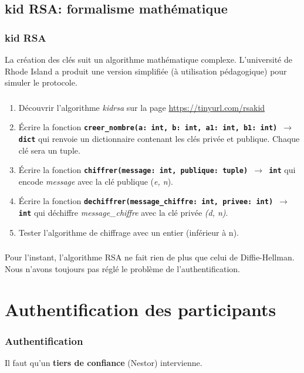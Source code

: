 \documentclass[svgnames,11pt]{beamer}
\begin{document}
\subsection{kid RSA: formalisme mathématique}
\begin{frame}
    \frametitle{kid RSA}

    La création des clés suit un algorithme mathématique complexe. L'université de Rhode Island a produit une version simplifiée (à utilisation pédagogique) pour simuler le protocole.

\end{frame}
\begin{frame}
    \frametitle{}

    \begin{activite}
        \begin{enumerate}
            \item Découvrir l'algorithme \emph{kidrsa} sur la page \url{https://tinyurl.com/rsakid}
            \item Écrire la fonction \textbf{\texttt{creer\_nombre(a: int, b: int, a1: int, b1: int) $\rightarrow$ dict}} qui renvoie un dictionnaire contenant les clés privée et publique. Chaque clé sera un tuple.
            \item Écrire la fonction \textbf{\texttt{chiffrer(message: int, publique: tuple) $\rightarrow$ int}} qui encode \emph{message} avec la clé publique (\emph{e, n}).
            \item Écrire la fonction \textbf{\texttt{dechiffrer(message\_chiffre: int, privee: int) $\rightarrow$ int}} qui déchiffre \emph{message\_chiffre} avec la clé privée \emph{(d, n)}.
            \item Tester l'algorithme de chiffrage avec un entier (inférieur à n).
        \end{enumerate}
        \end{activite}

\end{frame}

\begin{frame}
    \frametitle{}

\begin{center}
    Pour l'instant, l'algorithme RSA ne fait rien de plus que celui de Diffie-Hellman. Nous n'avons toujours pas réglé le problème de l'authentification.

\end{center}

\end{frame}
\section{Authentification des participants}
\begin{frame}
    \frametitle{Authentification}
Il faut qu'un \textbf{tiers de confiance} (Nestor) intervienne.

\end{frame}
\end{document}
